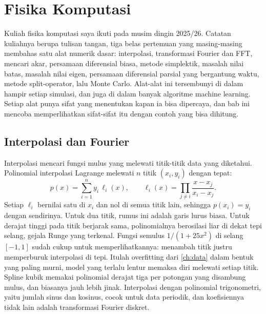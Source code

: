 \chapter{Fisika Komputasi}
\label{ch:fiskom}

Kuliah fisika komputasi saya ikuti pada musim dingin 2025/26. Catatan kuliahnya berupa tulisan
tangan, tiga belas pertemuan yang masing-masing membahas satu alat numerik dasar: interpolasi,
transformasi Fourier dan FFT, mencari akar, persamaan diferensial biasa, metode simplektik, masalah
nilai batas, masalah nilai eigen, persamaan diferensial parsial yang bergantung waktu, metode
split-operator, lalu Monte Carlo. Alat-alat ini tersembunyi di dalam hampir setiap simulasi, dan
juga di dalam banyak algoritme machine learning. Setiap alat punya sifat yang menentukan kapan ia bisa
dipercaya, dan bab ini mencoba memperlihatkan sifat-sifat itu dengan contoh yang bisa dihitung.

\section{Interpolasi dan Fourier}

Interpolasi mencari fungsi mulus yang melewati titik-titik data yang diketahui. Polinomial interpolasi
Lagrange melewati $n$ titik $(x_i,y_i)$ dengan tepat:
\begin{equation}
p(x)=\sum_{i=1}^ny_i\,\ell_i(x),\qquad \ell_i(x)=\prod_{j\ne i}\frac{x-x_j}{x_i-x_j}.
\end{equation}
Setiap $\ell_i$ bernilai satu di $x_i$ dan nol di semua titik lain, sehingga $p(x_i)=y_i$ dengan sendirinya.
Untuk dua titik, rumus ini adalah garis lurus biasa. Untuk derajat tinggi pada titik berjarak sama,
polinomialnya berosilasi liar di dekat tepi selang, gejala Runge yang terkenal. Fungsi semulus
$1/(1+25x^2)$ di selang $[-1,1]$ sudah cukup untuk memperlihatkannya: menambah titik justru memperburuk
interpolasi di tepi. Itulah overfitting dari \cref{ch:data} dalam bentuk yang paling murni, model
yang terlalu lentur memaksa diri melewati setiap titik. Spline kubik memakai polinomial derajat tiga per
potongan yang disambung mulus, dan biasanya jauh lebih jinak. Interpolasi dengan polinomial trigonometri,
yaitu jumlah sinus dan kosinus, cocok untuk data periodik, dan koefisiennya tidak lain adalah transformasi
Fourier diskret.

